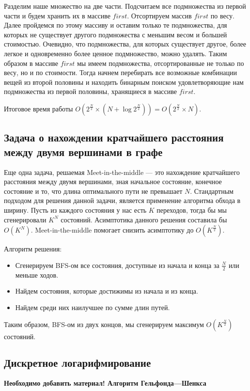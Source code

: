 Разделим наше множество на две части. Подсчитаем все подмножества из первой части и будем хранить их в массиве $first$. Отсортируем массив $first$ по весу. Далее пройдемся по этому массиву и оставим только те подмножества, для которых не существует другого подмножества с меньшим весом и большей стоимостью. Очевидно, что подмножества, для которых существует другое, более легкое и одновременно более ценное подмножество, можно удалять. Таким образом в массиве $first$ мы имеем подмножества, отсортированные не только по весу, но и по стоимости. Тогда начнем перебирать все возможные комбинации вещей из второй половины и находить бинарным поиском удовлетворяющие нам подмножества из первой половины, хранящиеся в массиве $first$.

Итоговое время работы $O({2^{\frac{N}{2}}}\times({N}+\log{2^{\frac{N}{2}}})) = O({2^{\frac{N}{2}}}\times{N})$.

\subsection{Задача о нахождении кратчайшего расстояния между двумя вершинами в графе}

Еще одна задача, решаемая Meet-in-the-middle — это нахождение кратчайшего расстояния между двумя вершинами, зная начальное состояние, конечное состояние и то, что длина оптимального пути не превышает $N$. Стандартным подходом для решения данной задачи, является применение алгоритма обхода в ширину. Пусть из каждого состояния у нас есть $K$ переходов, тогда бы мы сгенерировали $K^N$ состояний. Асимптотика данного решения составила бы $O(K^N)$. Meet-in-the-middle помогает снизить асимптотику до $O(K^{\frac{N}{2}})$.

Алгоритм решения:
\begin{itemize}
    \item Сгенерируем BFS-ом все состояния, доступные из начала и конца за $\frac{N}{2}$ или меньше ходов.
    \item Найдем состояния, которые достижимы из начала и из конца.
    \item Найдем среди них наилучшее по сумме длин путей.
\end{itemize}

Таким образом, BFS-ом из двух концов, мы сгенерируем максимум $O(K^{\frac{N}{2}})$ состояний.

\subsection{Дискретное логарифмирование}
\textbf{Необходимо добавить материал! Алгоритм Гельфонда—Шенкса}


